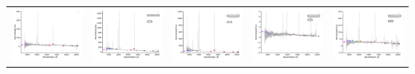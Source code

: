 \begin{center}
\begin{longtable}{l l l l l }
    \includegraphics[width=0.19\linewidth, clip]{Figs/Figs-lamost/spec-57751-KP114249S033242B02_sp11-099-SPLUS-n02s19-006979.pdf} & \includegraphics[width=0.19\linewidth, clip]{Figs/Figs-lamost/spec-57751-KP114249S033242B02_sp12-186-SPLUS-n02s20-017833.pdf} & \includegraphics[width=0.19\linewidth, clip]{Figs/Figs-lamost/spec-57787-HD114640S034432B01_sp16-027-SPLUS-n02s19-006979.pdf} & \includegraphics[width=0.19\linewidth, clip]{Figs/Figs-lamost/spec-57816-HD115813N032855M01_sp01-173-SPLUS-n02n22-059209.pdf} & \includegraphics[width=0.19\linewidth, clip]{Figs/Figs-lamost/spec-58078-EG224242N000415M01_sp04-100-STRIPE82-0145-047131.pdf} \\

\end{longtable}
\end{center}
